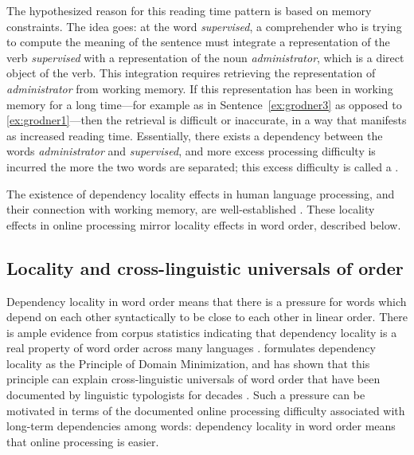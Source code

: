 The hypothesized reason for this reading time pattern is based on memory constraints. The idea goes: at the word \emph{supervised}, a comprehender who is trying to compute the meaning of the sentence must integrate a representation of the verb \emph{supervised} with a representation of the noun \emph{administrator}, which is a direct object of the verb. This integration requires retrieving the representation of \emph{administrator} from working memory. If this representation has been in working memory for a long time---for example as in Sentence~\ref{ex:grodner3} as opposed to \ref{ex:grodner1}---then the retrieval is difficult or inaccurate, in a way that manifests as increased reading time. Essentially, there exists a dependency between the words \emph{administrator} and \emph{supervised}, and more excess processing difficulty is incurred the more the two words are separated; this excess difficulty is called a .

The existence of dependency locality effects in human language processing, and their connection with working memory, are well-established \citep{fedorenko2013direct}. These locality effects in online processing mirror locality effects in word order, described below.



\subsection{Locality and cross-linguistic universals of order}

Dependency locality in word order means that there is a pressure for words which depend on each other syntactically to be close to each other in linear order.
There is ample evidence from corpus statistics indicating that dependency locality is a real property of word order across many languages \citep{gildea-optimizing-2007,liu2008dependency,gildea-grammars-2010,futrell-large-scale-2015,liu-dependency-2017,temperley-minimizing-2018}. 
\citet{hawkins1994performance,hawkins-efficiency-2003} formulates dependency locality as the Principle of Domain Minimization, and has shown that this principle can explain cross-linguistic universals of word order that have been documented by linguistic typologists for decades \citep{greenberg-universals-1963}. 
Such a pressure can be motivated in terms of the documented online processing difficulty associated with long-term dependencies among words: dependency locality in word order means that online processing is easier.

